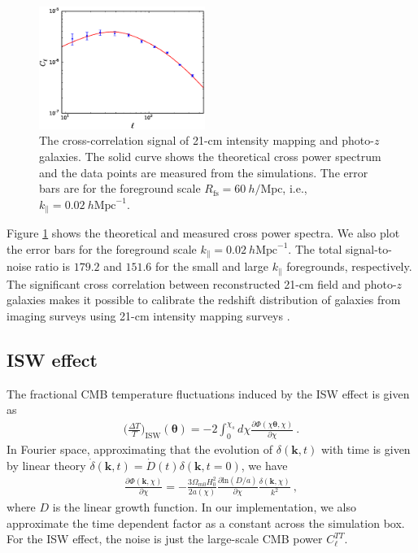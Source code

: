 \documentclass[prd,superscriptaddress,floatfix,notitlepage,nofootinbib,reprint]{revtex4-1}
\newcommand{\mr}{\mathrm}
\newcommand{\kpa}{k_\parallel}
\begin{document}
\begin{figure}[tbp]
\begin{center}
\includegraphics[width=0.48\textwidth]{./figs/f5.eps}
\end{center}
\vspace{-0.7cm}
\caption{The cross-correlation signal of 21-cm intensity mapping and photo-$z$ 
    galaxies. The solid curve shows the theoretical cross power spectrum and 
    the data points are measured from the simulations. 
    The error bars are for the foreground scale $R_\mr{fs}=60\ h/\mr{Mpc}$, 
    i.e., $\kpa=0.02\ h\mr{Mpc}^{-1}$.
}
\label{fig:xcc2}
\end{figure}

Figure \ref{fig:xcc2} shows the theoretical and measured cross power spectra. 
We also plot the error bars for the foreground scale $\kpa=0.02\ h\mr{Mpc}^{-1}$.
The total signal-to-noise ratio is $179.2$ and $151.6$ for the small and large
$\kpa$ foregrounds, respectively.
The significant cross correlation between reconstructed 21-cm field and photo-$z$ galaxies makes it possible to calibrate the redshift distribution of galaxies from imaging surveys using 21-cm intensity mapping surveys \cite{2017xPhotoz2}.

\subsection{ISW effect}

The fractional CMB temperature fluctuations induced by the 
ISW effect is given as 
\begin{eqnarray}
\bigg(\frac{\Delta T}{T}\bigg)_\mr{ISW}(\bm\theta)=-2\int_0^{\chi_s}d\chi
\frac{\partial\Phi(\chi\bm{\theta},\chi)}{\partial\chi}\ .
\end{eqnarray}
In Fourier space, approximating that the evolution of $\delta(\bm{k},t)$ with 
time is given by linear theory
$\dot\delta(\bm{k},t)=\dot D(t)\delta(\bm{k},t=0)$, we have
\begin{eqnarray}
\frac{\partial\Phi(\bm{k},\chi)}{\partial\chi}=-\frac{3\Omega_{m0}H_0^2}
{2a(\chi)}\frac{\partial\mr{ln}(D/a)}{\partial\chi}
\frac{\delta(\bm{k},\chi)}{k^2}\ ,
\end{eqnarray}
where $D$ is the linear growth function.
In our implementation, we also approximate the time dependent factor as a 
constant across the simulation box.
For the ISW effect, the noise is just the large-scale CMB power $C_\ell^{TT}$. 
\end{document}
